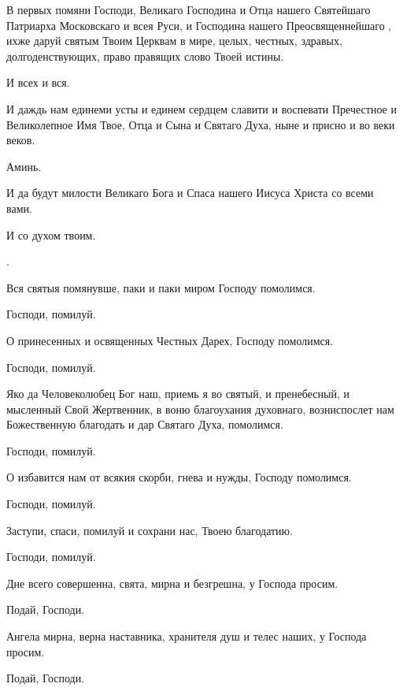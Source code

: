 \begin{mymulticols}
 В первых помяни Господи, Великаго Господина и Отца нашего  Святейшаго Патриарха Московскаго и всея Руси, и Господина нашего Преосвященнейшаго , ихже даруй святым Твоим Церквам в мире, целых, честных, здравых, долгоденствующих, право правящих слово Твоей истины. 

 И всех и вся.

 И даждь нам единеми усты и единем сердцем славити и воспевати Пречестное и Великолепное Имя Твое, Отца и Сына и Святаго Духа, ныне и присно и во веки веков. 

 Аминь.

 И да будут милости Великаго Бога и Спаса нашего Иисуса Христа со всеми вами.

 И со духом твоим.

. 


 Вся святыя помянувше, паки и паки миром Господу помолимся. 

 Господи, помилуй.

 О принесенных и освященных Честных Дарех, Господу помолимся. 

 Господи, помилуй.

 Яко да Человеколюбец Бог наш, приемь я во святый, и пренебесный, и мысленный Свой Жертвенник, в воню благоухания духовнаго, возниспослет нам Божественную благодать и дар Святаго Духа, помолимся. 

 Господи, помилуй.

 О избавится нам от всякия скорби, гнева и нужды, Господу помолимся. 

 Господи, помилуй.

 Заступи, спаси, помилуй и сохрани нас, Твоею благодатию. 

 Господи, помилуй.

 Дне всего совершенна, свята, мирна и безгрешна, у Господа просим. 

 Подай, Господи.

 Ангела мирна, верна наставника, хранителя душ и телес наших, у Господа просим. 

 Подай, Господи.


\end{mymulticols}
